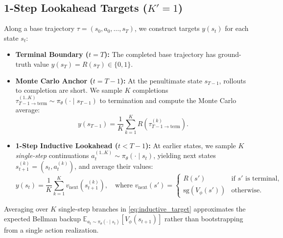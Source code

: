 \documentclass[11pt,a4paper]{article}
\newcommand{\E}{\mathbb{E}}
\newcommand{\sg}{\text{sg}}
\begin{document}
\subsection{\texorpdfstring{1-Step Lookahead Targets ($K' = 1$)}{1-Step Lookahead Targets (K' = 1)}}
Along a base trajectory $\tau = (s_0, a_0, \dots, s_T)$, we construct targets $y(s_t)$ for each state $s_t$:
\begin{itemize}
    \item \textbf{Terminal Boundary ($t = T$):} The completed base trajectory has ground-truth value $y(s_T) = R(s_T) \in \{0, 1\}$.
    \item \textbf{Monte Carlo Anchor ($t = T - 1$):} At the penultimate state $s_{T-1}$, rollouts to completion are short. We sample $K$ completions $\tau_{T-1 \to \text{term}}^{(1..K)} \sim \pi_\theta(\cdot \mid s_{T-1})$ to termination and compute the Monte Carlo average:
    \begin{equation}
        y(s_{T-1}) = \frac{1}{K} \sum_{k=1}^K R\!\left(\tau_{T-1 \to \text{term}}^{(k)}\right).
        \label{eq:mc_anchor}
    \end{equation}
    \item \textbf{1-Step Inductive Lookahead ($t < T - 1$):} At earlier states, we sample $K$ \emph{single-step} continuations $a_t^{(1..K)} \sim \pi_\theta(\cdot \mid s_t)$, yielding next states $s_{t+1}^{(k)} = (s_t, a_t^{(k)})$, and average their values:
    \begin{equation}
        y(s_t) = \frac{1}{K} \sum_{k=1}^K v_{\text{next}}\!\left(s_{t+1}^{(k)}\right), \quad \text{where } v_{\text{next}}(s') = \begin{cases} R(s') & \text{if } s' \text{ is terminal}, \\ \sg\!\left(V_\phi(s')\right) & \text{otherwise.} \end{cases}
        \label{eq:inductive_target}
    \end{equation}
\end{itemize}
Averaging over $K$ single-step branches in \cref{eq:inductive_target} approximates the expected Bellman backup $\E_{a_t \sim \pi_\theta(\cdot \mid s_t)}[V_\phi(s_{t+1})]$ rather than bootstrapping from a single action realization.
\end{document}
